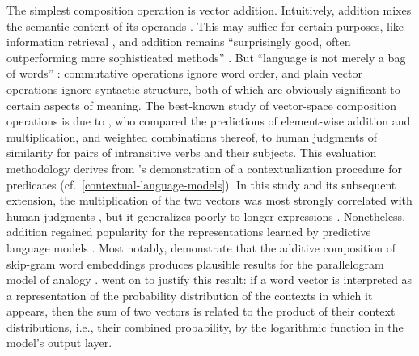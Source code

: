 The simplest composition operation is vector addition.
Intuitively, addition mixes the semantic content of its operands
\parencites[292-293]{Lenci2023}.
This may suffice for certain purposes, like information retrieval
\parencites[229-231]{Landauer1997}, and addition remains ``surprisingly good, often
outperforming more sophisticated methods'' \parencites[10]{Boleda2020}.
But ``language is not merely a bag of words'' \parencites[156]{Harris1954}: commutative
operations ignore word order, and plain vector operations ignore syntactic structure,
both of which are obviously significant to certain aspects of meaning.
The best-known study of vector-space composition operations is due to
\textcites{Mitchell2008}, who compared the predictions of element-wise addition and
multiplication, and weighted combinations thereof, to human judgments of similarity for
pairs of intransitive verbs and their subjects.
This evaluation methodology derives from \textcite{Kintsch2001}'s demonstration of a
contextualization procedure for predicates (cf.~\cref{contextual-language-models}).
In this study and its subsequent extension, the multiplication of the two vectors was
most strongly correlated with human judgments
\parencites[242-243]{Mitchell2008}[1414-1417]{Mitchell2010}, but it generalizes poorly
to longer expressions \parencites[17]{Grefenstette2013}.
Nonetheless, addition regained popularity for the representations learned by predictive
language models .
Most notably, \textcites{Mikolov2013} demonstrate that the additive composition of
skip-gram word embeddings produces plausible results for the parallelogram model of
analogy \parencites[cf.~\cref{cognition-and-evaluation}]{Rumelhart1973}.
\textcites{Mikolov2013a} went on to justify this result: if a word vector is interpreted
as a representation of the probability distribution of the contexts in which it appears,
then the sum of two vectors is related to the product of their context distributions,
i.e., their combined probability, by the logarithmic function in the model's output
layer.

